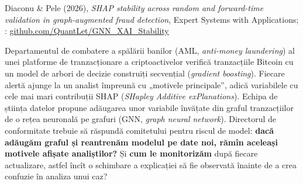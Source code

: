 
\renewcommand{\emqacase}{\T{Research case 3 (Lectures 9 and 11)}{Studiul de caz 3 (cursurile 9 și 11)}}

%
          { Diaconu \& Pele (2026), \emph{SHAP stability across random and forward-time validation in graph-augmented fraud detection},
            Expert Systems with Applications; : \href{https://github.com/QuantLet/GNN_XAI_Stability}{github.com/QuantLet/GNN\_XAI\_Stability}}

\begin{scenario}
%
{Departamentul de combatere a spălării banilor (AML, \emph{anti-money laundering}) al unei platforme de tranzacționare a criptoactivelor verifică tranzacțiile Bitcoin cu un model de arbori de decizie construiți secvențial (\emph{gradient boosting}). Fiecare alertă ajunge la un analist împreună cu „motivele principale”, adică variabilele cu cele mai mari contribuții SHAP (\emph{SHapley Additive exPlanations}).
Echipa de știința datelor propune adăugarea unor variabile învățate din graful tranzacțiilor de o rețea neuronală pe grafuri (GNN, \emph{graph neural network}). Directorul de conformitate trebuie să răspundă comitetului pentru riscul de model:
\textbf{dacă adăugăm graful și reantrenăm modelul pe date noi, rămîn aceleași motivele afișate analiștilor?} Și \textbf{cum le monitorizăm} după fiecare actualizare, astfel încît o schimbare a explicației să fie observată înainte de a crea confuzie în analiza unui caz?}
\end{scenario}


